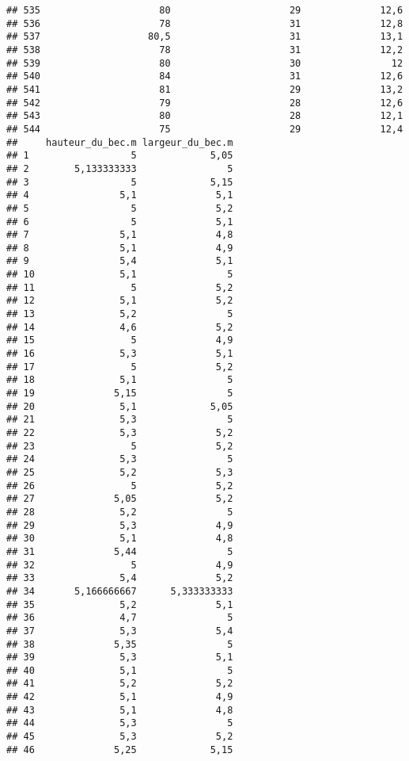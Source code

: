 \documentclass[
]{article}
\begin{document}
\begin{verbatim}
## 535                     80                     29              12,6
## 536                     78                     31              12,8
## 537                   80,5                     31              13,1
## 538                     78                     31              12,2
## 539                     80                     30                12
## 540                     84                     31              12,6
## 541                     81                     29              13,2
## 542                     79                     28              12,6
## 543                     80                     28              12,1
## 544                     75                     29              12,4
##     hauteur_du_bec.m largeur_du_bec.m
## 1                  5             5,05
## 2        5,133333333                5
## 3                  5             5,15
## 4                5,1              5,1
## 5                  5              5,2
## 6                  5              5,1
## 7                5,1              4,8
## 8                5,1              4,9
## 9                5,4              5,1
## 10               5,1                5
## 11                 5              5,2
## 12               5,1              5,2
## 13               5,2                5
## 14               4,6              5,2
## 15                 5              4,9
## 16               5,3              5,1
## 17                 5              5,2
## 18               5,1                5
## 19              5,15                5
## 20               5,1             5,05
## 21               5,3                5
## 22               5,3              5,2
## 23                 5              5,2
## 24               5,3                5
## 25               5,2              5,3
## 26                 5              5,2
## 27              5,05              5,2
## 28               5,2                5
## 29               5,3              4,9
## 30               5,1              4,8
## 31              5,44                5
## 32                 5              4,9
## 33               5,4              5,2
## 34       5,166666667      5,333333333
## 35               5,2              5,1
## 36               4,7                5
## 37               5,3              5,4
## 38              5,35                5
## 39               5,3              5,1
## 40               5,1                5
## 41               5,2              5,2
## 42               5,1              4,9
## 43               5,1              4,8
## 44               5,3                5
## 45               5,3              5,2
## 46              5,25             5,15

\end{verbatim}
\end{document}
